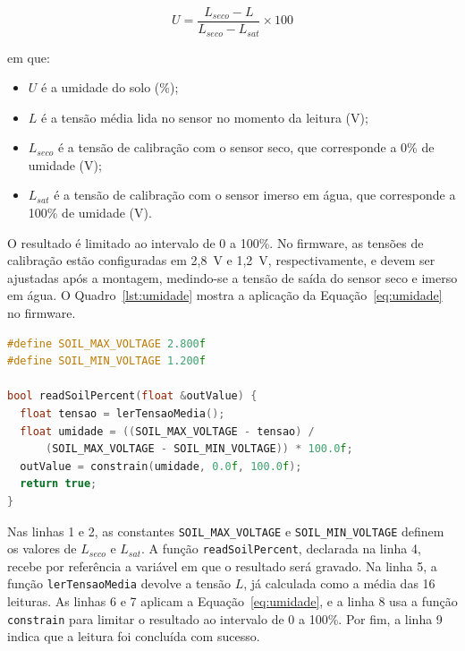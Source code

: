 \begin{equation}
  U = \frac{L_{seco} - L}{L_{seco} - L_{sat}} \times 100
  \label{eq:umidade}
\end{equation}

\noindent em que:
\begin{itemize}
  \item $U$ é a umidade do solo (\%);
  \item $L$ é a tensão média lida no sensor no momento da leitura (V);
  \item $L_{seco}$ é a tensão de calibração com o sensor seco, que corresponde a 0\% de umidade (V);
  \item $L_{sat}$ é a tensão de calibração com o sensor imerso em água, que corresponde a 100\% de umidade (V).
\end{itemize}

O resultado é limitado ao intervalo de 0 a 100\%. No firmware, as tensões de calibração estão configuradas em 2,8~V e 1,2~V, respectivamente, e devem ser ajustadas após a montagem, medindo-se a tensão de saída do sensor seco e imerso em água. O Quadro~\ref{lst:umidade} mostra a aplicação da Equação~\ref{eq:umidade} no firmware.

\vspace{0.6\baselineskip}
\noindent\begin{minipage}{\linewidth}
\begin{lstlisting}[language=C++, caption={Cálculo da umidade do solo no firmware (trecho de SoilSensor)}, label={lst:umidade}]
#define SOIL_MAX_VOLTAGE 2.800f
#define SOIL_MIN_VOLTAGE 1.200f

bool readSoilPercent(float &outValue) {
  float tensao = lerTensaoMedia();
  float umidade = ((SOIL_MAX_VOLTAGE - tensao) /
      (SOIL_MAX_VOLTAGE - SOIL_MIN_VOLTAGE)) * 100.0f;
  outValue = constrain(umidade, 0.0f, 100.0f);
  return true;
}
\end{lstlisting}
\vspace{-0.5\baselineskip}
\end{minipage}
\medskip

Nas linhas 1 e 2, as constantes \texttt{SOIL\_\allowbreak MAX\_\allowbreak VOLTAGE} e \texttt{SOIL\_\allowbreak MIN\_\allowbreak VOLTAGE} definem os valores de $L_{seco}$ e $L_{sat}$. A função \texttt{readSoilPercent}, declarada na linha 4, recebe por referência a variável em que o resultado será gravado. Na linha 5, a função \texttt{lerTensaoMedia} devolve a tensão $L$, já calculada como a média das 16 leituras. As linhas 6 e 7 aplicam a Equação~\ref{eq:umidade}, e a linha 8 usa a função \texttt{constrain} para limitar o resultado ao intervalo de 0 a 100\%. Por fim, a linha 9 indica que a leitura foi concluída com sucesso.

